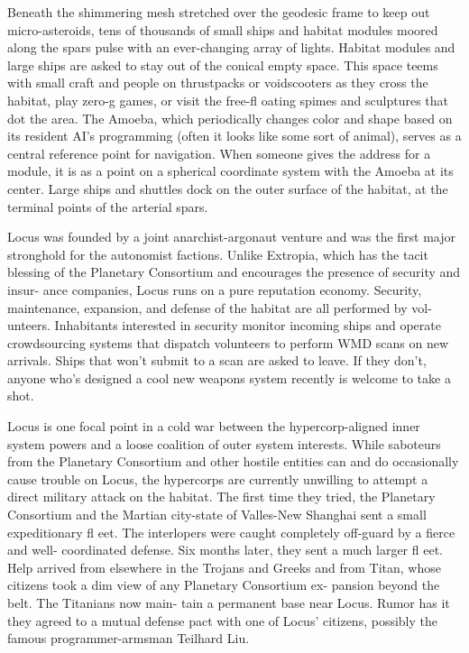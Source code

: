 Beneath the shimmering mesh stretched over the 
geodesic frame to keep out micro-asteroids, tens of 
thousands of small ships and habitat modules moored 
along the spars pulse with an ever-changing array 
of lights. Habitat modules and large ships are asked 
to stay out of the conical empty space. This space 
teems with small craft and people on thrustpacks or 
voidscooters as they cross the habitat, play zero-g 
games, or visit the free-fl oating spimes and sculptures 
that dot the area. The Amoeba, which periodically 
changes color and shape based on its resident AI's 
programming (often it looks like some sort of animal), 
serves as a central reference point for navigation. 
When someone gives the address for a module, it is 
as a point on a spherical coordinate system with the 
Amoeba at its center. Large ships and shuttles dock on 
the outer surface of the habitat, at the terminal points 
of the arterial spars.

Locus was founded by a joint anarchist-argonaut 
venture and was the first major stronghold for 
the autonomist factions. Unlike Extropia, which 
has the tacit blessing of the Planetary Consortium 
and encourages the presence of security and insur-
ance companies, Locus runs on a pure reputation 
economy. Security, maintenance, expansion, and 
defense of the habitat are all performed by vol-
unteers. Inhabitants interested in security monitor 
incoming ships and operate crowdsourcing systems 
that dispatch volunteers to perform WMD scans on 
new arrivals. Ships that won't submit to a scan are 
asked to leave. If they don't, anyone who's designed 
a cool new weapons system recently is welcome to 
take a shot.

Locus is one focal point in a cold war between the 
hypercorp-aligned inner system powers and a loose 
coalition of outer system interests. While saboteurs 
from the Planetary Consortium and other hostile 
entities can and do occasionally cause trouble on 
Locus, the hypercorps are currently unwilling to 
attempt a direct military attack on the habitat. The 
first time they tried, the Planetary Consortium and 
the Martian city-state of Valles-New Shanghai sent 
a small expeditionary fl eet. The interlopers were 
caught completely off-guard by a fierce and well-
coordinated defense. Six months later, they sent a 
much larger fl eet. Help arrived from elsewhere in the 
Trojans and Greeks and from Titan, whose citizens 
took a dim view of any Planetary Consortium ex-
pansion beyond the belt. The Titanians now main-
tain a permanent base near Locus. Rumor has it they 
agreed to a mutual defense pact with one of Locus' 
citizens, possibly the famous programmer-armsman 
Teilhard Liu.

